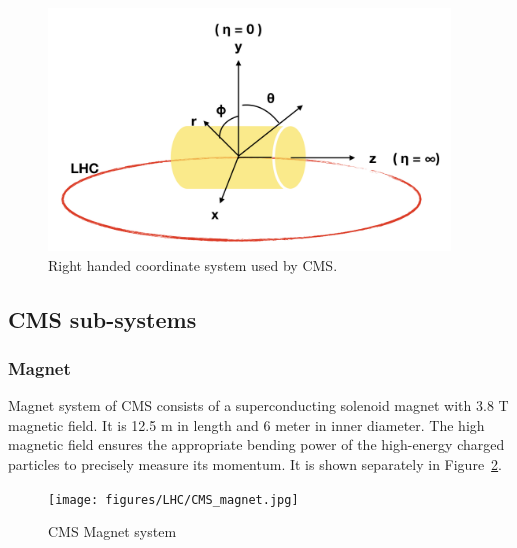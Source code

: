 \begin{figure}[htbp]
	\centering
	\includegraphics[width=0.95\textwidth]{figures/LHC/CMS-coordinate-system.png}
	\caption{Right handed coordinate system used by CMS.}
	\label{fig:cms-coordinate-system}
\end{figure}

\subsection{CMS sub-systems} %
\label{sub:cms_sub_systems}

\subsubsection{Magnet} %
\label{ssub:magnet}
Magnet system of CMS consists of a superconducting solenoid magnet with 3.8 T magnetic field. It is 12.5 m in length and 6 meter in inner diameter. The high magnetic field ensures the appropriate bending power of the high-energy charged particles to precisely measure its momentum. It is shown separately in Figure~\ref{fig:CMS-magnet}.

\begin{figure}[!htbp]
	\centering
	\texttt{[image: figures/LHC/CMS\_magnet.jpg]}
	\caption{CMS Magnet system}
	\label{fig:CMS-magnet}
\end{figure}

